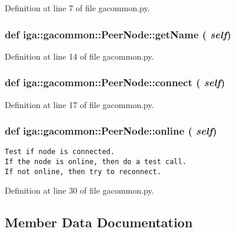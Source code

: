 Definition at line 7 of file gacommon.py.
\subsubsection{\setlength{\rightskip}{0pt plus 5cm}def iga::gacommon::PeerNode::getName ( {\em self})}\label{classiga_1_1gacommon_1_1PeerNode_7c0f7c5cf7ac766649ce444e0f634e4b}




Definition at line 14 of file gacommon.py.
\subsubsection{\setlength{\rightskip}{0pt plus 5cm}def iga::gacommon::PeerNode::connect ( {\em self})}\label{classiga_1_1gacommon_1_1PeerNode_7fab9fde4884d6419399d72b584600ff}




Definition at line 17 of file gacommon.py.
\subsubsection{\setlength{\rightskip}{0pt plus 5cm}def iga::gacommon::PeerNode::online ( {\em self})}\label{classiga_1_1gacommon_1_1PeerNode_edcbb10ee8c10537dc51f2c1e319e968}




\footnotesize\begin{verbatim}
Test if node is connected. 
If the node is online, then do a test call.
If not online, then try to reconnect.
\end{verbatim}
\normalsize
 

Definition at line 30 of file gacommon.py.

\subsection{Member Data Documentation}
\subsubsection{}\label{classiga_1_1gacommon_1_1PeerNode_6e22da6a7ddd03110c13a129beab9876}





